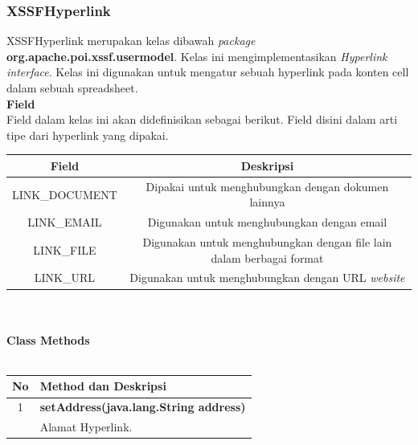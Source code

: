 \subsubsection{XSSFHyperlink}
XSSFHyperlink merupakan kelas dibawah \textit{package} \textbf{org.apache.poi.xssf.usermodel}. Kelas ini mengimplementasikan \textit{Hyperlink interface}. Kelas ini digunakan untuk mengatur sebuah hyperlink pada konten cell dalam sebuah spreadsheet.\cite{apachepoi2}
\\
\noindent \textbf{Field}\\
Field dalam kelas ini akan didefinisikan sebagai berikut. Field disini dalam arti tipe dari hyperlink yang dipakai.\\
\begin{tabular}{|c|c|}
		\hline
		\textbf{Field} & \textbf{Deskripsi} \\ \hline \hline
		LINK\_DOCUMENT & Dipakai untuk menghubungkan dengan dokumen lainnya\\ \hline 
		LINK\_EMAIL &	Digunakan untuk menghubungkan dengan email\\ \hline 
		LINK\_FILE & Digunakan untuk menghubungkan dengan file lain dalam berbagai format \\ \hline
		LINK\_URL	&	Digunakan untuk menghubungkan dengan URL \textit{website}\\ \hline
	\end{tabular}
	\\ \\
	\noindent \textbf{Class Methods}\\ \\
	\begin{tabular}{|c|p{12cm}|}
		\hline
		\textbf{No} & \textbf{Method dan Deskripsi} \\ \hline \hline
		1 & \textbf{setAddress(java.lang.String address)}\\
			&	Alamat Hyperlink.\\ \hline
	\end{tabular}

